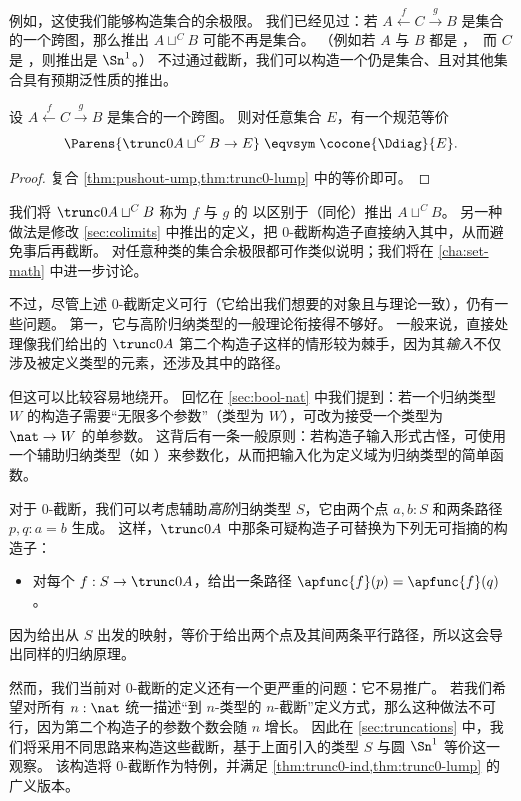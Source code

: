 %
%
例如，这使我们能够构造集合的余极限。
我们已经见过：若 $A \xleftarrow{f} C \xrightarrow{g} B$ 是集合的一个跨图，那么推出 $A\sqcup^C B$ 可能不再是集合。
（例如若 $A$ 与 $B$ 都是 \unit，而 $C$ 是 \bool，则推出是 $\Sn^1$。）
不过通过截断，我们可以构造一个仍是集合、且对其他集合具有预期泛性质的推出。

\begin{lem}\label{thm:set-pushout}
  设 $A \xleftarrow{f} C \xrightarrow{g} B$ 是集合的一个跨图。
  则对任意集合 $E$，有一个规范等价
  \[ \Parens{\trunc0{A\sqcup^C B} \to E} \;\eqvsym\; \cocone{\Ddiag}{E}. \]
\end{lem}
\begin{proof}
  复合 \cref{thm:pushout-ump,thm:trunc0-lump} 中的等价即可。
\end{proof}

我们将 $\trunc0{A\sqcup^C B}$ 称为 $f$ 与 $g$ 的
%
以区别于（同伦）推出 $A\sqcup^C B$。
另一种做法是修改 \cref{sec:colimits} 中推出的定义，把 $0$-截断构造子直接纳入其中，从而避免事后再截断。
对任意种类的集合余极限都可作类似说明；我们将在 \cref{cha:set-math} 中进一步讨论。

不过，尽管上述 $0$-截断定义可行（它给出我们想要的对象且与理论一致），仍有一些问题。
第一，它与高阶归纳类型的一般理论衔接得不够好。
一般来说，直接处理像我们给出的 $\trunc0A$ 第二个构造子这样的情形较为棘手，因为其\emph{输入}不仅涉及被定义类型的元素，还涉及其中的路径。

但这可以比较容易地绕开。
回忆在 \cref{sec:bool-nat} 中我们提到：若一个归纳类型 $W$ 的构造子需要“无限多个参数”（类型为 $W$），可改为接受一个类型为 $\nat\to W$ 的单参数。
这背后有一条一般原则：若构造子输入形式古怪，可使用一个辅助归纳类型（如 \nat）来参数化，从而把输入化为定义域为归纳类型的简单函数。

对于 $0$-截断，我们可以考虑辅助\emph{高阶}归纳类型 $S$，它由两个点 $a,b:S$ 和两条路径 $p,q:a=b$ 生成。
这样，$\trunc 0A$ 中那条可疑构造子可替换为下列无可指摘的构造子：
\begin{itemize}
\item 对每个 $f:S\to \trunc 0A$，给出一条路径 $\apfunc{f}(p) = \apfunc{f}(q)$。
\end{itemize}
因为给出从 $S$ 出发的映射，等价于给出两个点及其间两条平行路径，所以这会导出同样的归纳原理。

%

%
%
然而，我们当前对 $0$-截断的定义还有一个更严重的问题：它不易推广。
若我们希望对所有 $n:\nat$ 统一描述“到 $n$-类型的 $n$-截断”定义方式，那么这种做法不可行，因为第二个构造子的参数个数会随 $n$ 增长。
因此在 \cref{sec:truncations} 中，我们将采用不同思路来构造这些截断，基于上面引入的类型 $S$ 与圆 $\Sn^1$ 等价这一观察。
该构造将 $0$-截断作为特例，并满足 \cref{thm:trunc0-ind,thm:trunc0-lump} 的广义版本。


